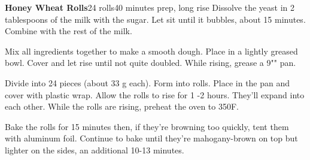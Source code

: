 \documentclass[../Cookbook.tex]{subfiles}
\begin{document}
\begin{recipe}[HoneyWheatRolls]{\textbf{Honey Wheat Rolls}}{24 rolls}{40 minutes prep, long rise}
	Dissolve the yeast in 2 tablespoons of the milk with the sugar. Let sit until it bubbles, about 15 minutes.
	Combine with the rest of the milk.
	
	Mix all ingredients together to make a smooth dough.
	Place in a lightly greased bowl.
	Cover and let rise until not quite doubled.
	While rising, grease a 9"" pan.
	
	Divide into 24 pieces (about 33 g each).
	Form into rolls. Place in the pan and cover with plastic wrap. Allow the rolls to rise for 1 -2 hours. They'll expand into each other.
	While the rolls are rising, preheat the oven to 350\0F.
	
	Bake the rolls for 15 minutes then, if they're browning too quickly, tent them with aluminum foil.
	Continue to bake until they're mahogany-brown on top but lighter on the sides, an additional 10-13 minutes.	
\end{recipe}
\end{document}
